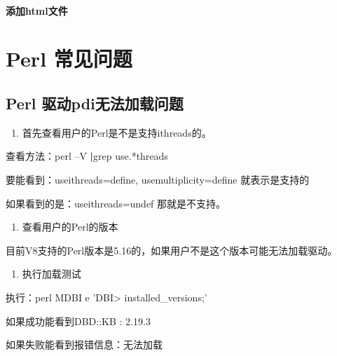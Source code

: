 \documentclass[letterpaper,10pt,english]{sphinxmanual}
\begin{document}
\paragraph{添加html文件}
\label{\detokenize{interface/thinkPHP:html}}

\section{Perl 常见问题}
\label{\detokenize{interface/perl:perl}}\label{\detokenize{interface/perl::doc}}

\subsection{Perl 驱动pdi无法加载问题}
\label{\detokenize{interface/perl:perl-pdi}}\begin{enumerate}
%
\item {} 
首先查看用户的Perl是不是支持ithreads的。

\end{enumerate}

查看方法：perl –V {\color{red}\bfseries{}|}grep use.*threads

要能看到：useithreads=define, usemultiplicity=define 就表示是支持的

如果看到的是：useithreads=undef 那就是不支持。
\begin{enumerate}
%
\setcounter{enumi}{1}
\item {} 
查看用户的Perl的版本

\end{enumerate}

目前V8支持的Perl版本是5.16的，如果用户不是这个版本可能无法加载驱动。
\begin{enumerate}
%
\setcounter{enumi}{2}
\item {} 
执行加载测试

\end{enumerate}

执行：perl \sphinxhyphen{}MDBI \sphinxhyphen{}e 'DBI\sphinxhyphen{}> installed\_versions;'

如果成功能看到DBD::KB         : 2.19.3

如果失败能看到报错信息：无法加载

\begin{figure}[htbp]
\centering

\noindent{}
\end{figure}
\end{document}
